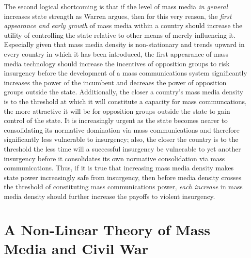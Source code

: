 \documentclass[11pt,article,oneside]{memoir}
\begin{document}
The second logical shortcoming is that if the level of mass media
\emph{in general} increases state strength as Warren argues, then for
this very reason, the \emph{first appearance and early growth} of mass
media within a country should increase the utility of controlling the
state relative to other means of merely influencing it. Especially given
that mass media density is non-stationary and trends upward in every
country in which it has been introduced, the first appearance of mass
media technology should increase the incentives of opposition groups to
risk insurgency before the development of a mass communications system
significantly increases the power of the incumbent and decreaes the
power of opposition groups outside the state. Additionally, the closer a
country's mass media density is to the threshold at which it will
constitute a capacity for mass communcations, the more attractive it
will be for opposition groups outside the state to gain control of the
state. It is increasingly urgent as the state becomes nearer to
consolidating its normative domination via mass communications and
therefore significantly less vulnerable to insurgency; also, the closer
the country is to the threshold the less time will a successful
insurgency be vulnerable to yet another insurgency before it
consolidates its own normative consolidation via mass communications.
Thus, if it is true that increasing mass media density makes state power
increasingly safe from insurgency, then before media density crosses the
threshold of constituting mass communications power, \emph{each
increase} in mass media density should further increase the payoffs to
violent insurgency.

\section{A Non-Linear Theory of Mass Media and Civil
War}\label{a-non-linear-theory-of-mass-media-and-civil-war}
\end{document}
